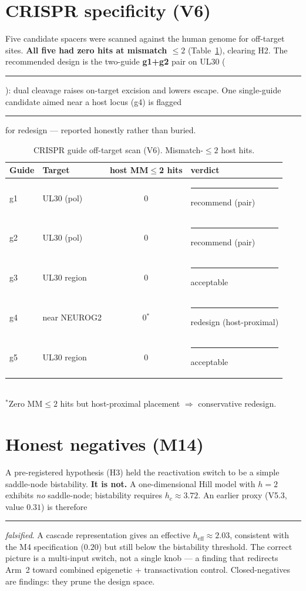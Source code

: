 \documentclass[11pt,a4paper]{article}
\newcommand{\tierdisc}[1]{\textcolor{#1}{\rule[0.05ex]{1.0ex}{1.0ex}}}
\newcommand{\tierGreen}{\tierdisc{green!60!black}}
\newcommand{\tierRed}{\tierdisc{red!80!black}}
\begin{document}
\section{CRISPR specificity (V6)}
\label{sec:crispr}
Five candidate spacers were scanned against the human genome for off-target
sites. \textbf{All five had zero hits at mismatch $\le 2$} (Table~\ref{tab:crispr}),
clearing H2. The recommended design is the two-guide \textbf{g1+g2} pair on UL30
(\tierGreen{}): dual cleavage raises on-target excision and lowers escape. One
single-guide candidate aimed near a host locus (g4) is flagged \tierRed{} for
redesign --- reported honestly rather than buried.

\begin{table}[t]
\centering
\caption{CRISPR guide off-target scan (V6). Mismatch-$\le 2$ host hits.}
\label{tab:crispr}
\small
\begin{tabular}{@{}llcl@{}}
\toprule
Guide & Target & host MM$\le$2 hits & verdict \\
\midrule
g1 & UL30 (pol) & 0 & \tierGreen{} recommend (pair) \\
g2 & UL30 (pol) & 0 & \tierGreen{} recommend (pair) \\
g3 & UL30 region & 0 & \tierGreen{} acceptable \\
g4 & near NEUROG2 & 0$^{*}$ & \tierRed{} redesign (host-proximal) \\
g5 & UL30 region & 0 & \tierGreen{} acceptable \\
\bottomrule
\end{tabular}
\\[2pt]
{\footnotesize $^{*}$Zero MM$\le2$ hits but host-proximal placement $\Rightarrow$ conservative redesign.}
\end{table}

\section{Honest negatives (M14)}
\label{sec:negatives}
A pre-registered hypothesis (H3) held the reactivation switch to be a simple
saddle-node bistability. \textbf{It is not.} A one-dimensional Hill model with
$h=2$ exhibits \emph{no} saddle-node; bistability requires $h_c\approx 3.72$.
An earlier proxy (V5.3, value $0.31$) is therefore \tierRed{} \emph{falsified}.
A cascade representation gives an effective $h_{\mathrm{eff}}\approx 2.03$,
consistent with the M4 specification ($0.20$) but still below the bistability
threshold. The correct picture is a multi-input switch, not a single knob ---
a finding that redirects Arm~2 toward combined epigenetic + transactivation
control. Closed-negatives are findings: they prune the design space.
\end{document}
